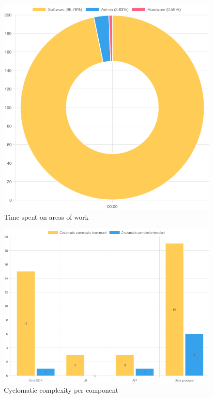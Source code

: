\begin{figure}[h]
\centering
\includegraphics[scale=0.5]{04_Artefakte/01_Abbildungen/time-spent-on-types-of-work}
\caption[Time spent on areas of work]{Time spent on areas of work\protect}
\label{fig:timeSpentTypeOfWork}
\end{figure}

\begin{figure}[h]
\centering
\includegraphics[scale=0.5]{04_Artefakte/01_Abbildungen/code-stats-complexity}
\caption[Cyclomatic complexity]{Cyclomatic complexity per component\protect}
\label{fig:cyclomaticComplexity}
\end{figure}

